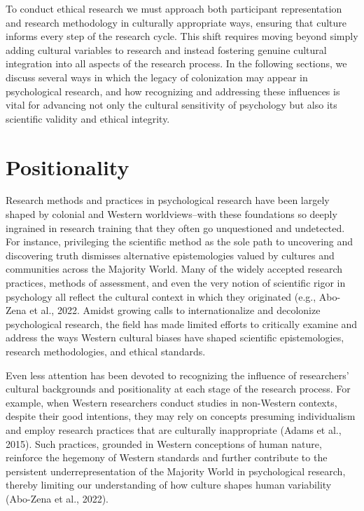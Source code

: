 \documentclass[
  11pt,
]{book}
\begin{document}
To conduct ethical research we must approach both participant representation and research methodology in culturally appropriate ways, ensuring that culture informs every step of the research cycle. This shift requires moving beyond simply adding cultural variables to research and instead fostering genuine cultural integration into all aspects of the research process. In the following sections, we discuss several ways in which the legacy of colonization may appear in psychological research, and how recognizing and addressing these influences is vital for advancing not only the cultural sensitivity of psychology but also its scientific validity and ethical integrity.

\section{Positionality}\label{positionality}

Research methods and practices in psychological research have been largely shaped by colonial and Western worldviews--with these foundations so deeply ingrained in research training that they often go unquestioned and undetected. For instance, privileging the scientific method as the sole path to uncovering and discovering truth dismisses alternative epistemologies valued by cultures and communities across the Majority World. Many of the widely accepted research practices, methods of assessment, and even the very notion of scientific rigor in psychology all reflect the cultural context in which they originated (e.g., Abo-Zena et al., 2022. Amidst growing calls to internationalize and decolonize psychological research, the field has made limited efforts to critically examine and address the ways Western cultural biases have shaped scientific epistemologies, research methodologies, and ethical standards.

Even less attention has been devoted to recognizing the influence of researchers' cultural backgrounds and positionality at each stage of the research process. For example, when Western researchers conduct studies in non-Western contexts, despite their good intentions, they may rely on concepts presuming individualism and employ research practices that are culturally inappropriate (Adams et al., 2015). Such practices, grounded in Western conceptions of human nature, reinforce the hegemony of Western standards and further contribute to the persistent underrepresentation of the Majority World in psychological research, thereby limiting our understanding of how culture shapes human variability (Abo-Zena et al., 2022).
\end{document}
